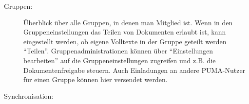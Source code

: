 \begin{description}
\item[Gruppen:]
Überblick über alle Gruppen, in denen man Mitglied ist. Wenn in den Gruppeneinstellungen das Teilen von Dokumenten erlaubt ist, kann eingestellt werden, ob eigene Volltexte in der Gruppe geteilt werden \enquote{Teilen}. Gruppenadministrationen können über \enquote{Einstellungen bearbeiten} auf die Gruppeneinstellungen zugreifen und z.B. die Dokumentenfreigabe steuern. Auch Einladungen an andere PUMA-Nutzer für einen Gruppe können hier versendet werden.  
\item[Synchronisation:]
\end{description}
